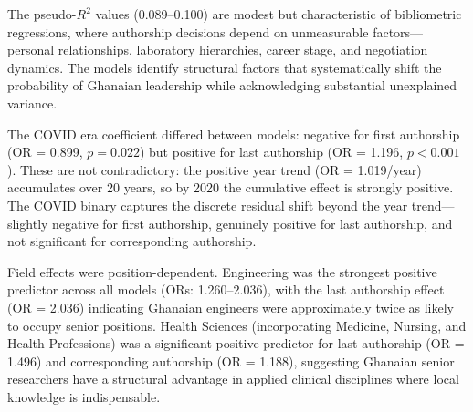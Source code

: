\documentclass[12pt, a4paper]{article}
\begin{document}
The pseudo-$R^2$ values (0.089--0.100) are modest but characteristic of bibliometric regressions, where authorship decisions depend on unmeasurable factors---personal relationships, laboratory hierarchies, career stage, and negotiation dynamics. The models identify structural factors that systematically shift the probability of Ghanaian leadership while acknowledging substantial unexplained variance.

The COVID era coefficient differed between models: negative for first authorship (OR = 0.899, $p = 0.022$) but positive for last authorship (OR = 1.196, $p < 0.001$). These are not contradictory: the positive year trend (OR = 1.019/year) accumulates over 20 years, so by 2020 the cumulative effect is strongly positive. The COVID binary captures the discrete residual shift beyond the year trend---slightly negative for first authorship, genuinely positive for last authorship, and not significant for corresponding authorship.

Field effects were position-dependent. Engineering was the strongest positive predictor across all models (ORs: 1.260--2.036), with the last authorship effect (OR = 2.036) indicating Ghanaian engineers were approximately twice as likely to occupy senior positions. Health Sciences (incorporating Medicine, Nursing, and Health Professions) was a significant positive predictor for last authorship (OR = 1.496) and corresponding authorship (OR = 1.188), suggesting Ghanaian senior researchers have a structural advantage in applied clinical disciplines where local knowledge is indispensable.
\end{document}
